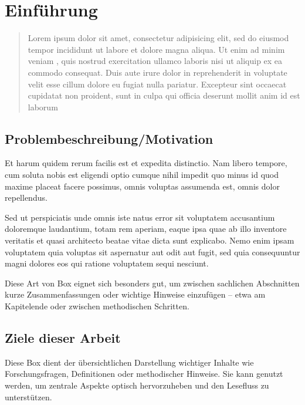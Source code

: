 \chapter{Einführung}
\begin{quote}
Lorem ipsum dolor sit amet, consectetur adipisicing elit, sed do eiusmod tempor incididunt ut labore et dolore magna aliqua. Ut enim ad minim veniam \cite{smith2020example} , quis nostrud exercitation ullamco laboris nisi ut aliquip ex ea commodo consequat. Duis aute irure dolor in reprehenderit in voluptate velit \cite{doe2019research}  esse cillum dolore eu fugiat nulla pariatur. Excepteur sint occaecat cupidatat non proident, sunt in culpa qui officia deserunt mollit anim id est laborum \cite{lee2018conference} 
\end{quote} 

\section{Problembeschreibung/Motivation}

Et harum quidem rerum facilis est et expedita distinctio. Nam libero tempore, cum soluta nobis est eligendi optio cumque nihil impedit quo minus id quod maxime placeat facere possimus, omnis voluptas assumenda est, omnis dolor repellendus.

Sed ut perspiciatis unde omnis iste natus error sit voluptatem accusantium doloremque laudantium, totam rem aperiam, eaque ipsa quae ab illo inventore \cite{miller2017chapter}  veritatis et quasi architecto beatae vitae dicta sunt explicabo. Nemo enim ipsam voluptatem quia voluptas sit aspernatur aut \cite{website2021example}  odit aut fugit, sed quia consequuntur magni dolores eos qui ratione voluptatem sequi nesciunt.

\begin{tcolorbox}[arc=3mm, boxrule=0pt, leftrule=4pt, left=10pt]
Diese Art von Box eignet sich besonders gut, um zwischen sachlichen Abschnitten kurze Zusammenfassungen oder wichtige Hinweise einzufügen – etwa am Kapitelende oder zwischen methodischen Schritten.
\end{tcolorbox}

\section{Ziele dieser Arbeit}

\begin{center}
\begin{minipage}{\textwidth}
\begin{tcolorbox}[title=\textbf{Forschungsfragen, Infobox, Definition etc.}, left=1mm, right=1mm]
\raggedright
Diese Box dient der übersichtlichen Darstellung wichtiger Inhalte wie Forschungsfragen, Definitionen oder methodischer Hinweise. Sie kann genutzt werden, um zentrale Aspekte optisch hervorzuheben und den Lesefluss zu unterstützen. \\
\end{tcolorbox}
\end{minipage}
\end{center}

